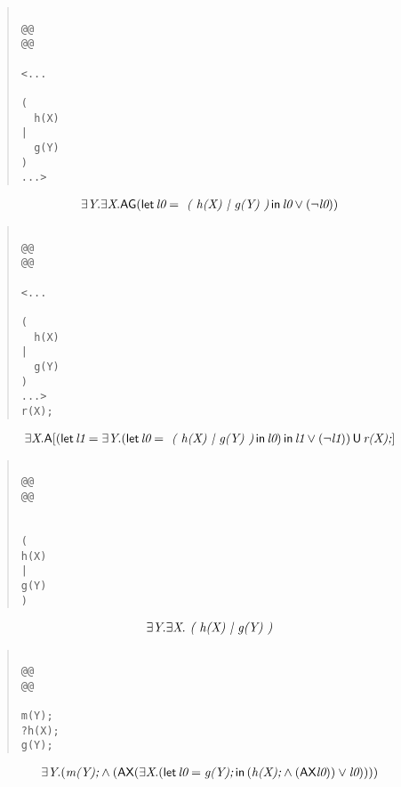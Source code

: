 \documentclass{article}
\newcommand{\U}{\,\mbox{\sf{U}}\,}
\newcommand{\A}{\mbox{\sf{A}}}
\newcommand{\AX}{\mbox{\sf{AX}}}
\newcommand{\AG}{\mbox{\sf{AG}}}
\newcommand{\mita}[1]{\mbox{\it{{#1}}}}
\begin{document}
\begin{quote}\begin{verbatim}

@@
@@

<...
  
(
  h(X)
|
  g(Y)
)
...>
\end{verbatim}\end{quote}

\[\begin{array}{l}
\exists \mita{Y} . \exists \mita{X} . \AG(\mita{\sf{let}} \, \mita{l0} = \mita{
(
h(X)
|
g(Y)
)} \, \mita{\sf{in}} \, \mita{l0} \vee (\neg \mita{l0})
)
\end{array}\]

\begin{quote}\begin{verbatim}

@@
@@

<...
  
(
  h(X)
|
  g(Y)
)
...>
r(X);
\end{verbatim}\end{quote}

\[\begin{array}{l}
\exists \mita{X} . \A[(\mita{\sf{let}} \, \mita{l1} = \exists \mita{Y} . (\mita{\sf{let}} \, \mita{l0} = \mita{
(
h(X)
|
g(Y)
)} \, \mita{\sf{in}} \, \mita{l0}
) \, \mita{\sf{in}} \, \mita{l1} \vee (\neg \mita{l1})
) \U \mita{r(X);}]

\end{array}\]

\begin{quote}\begin{verbatim}

@@
@@


(
h(X)
|
g(Y)
)
\end{verbatim}\end{quote}

\[\begin{array}{l}
\exists \mita{Y} . \exists \mita{X} . \mita{
(
h(X)
|
g(Y)
)}
\end{array}\]

\begin{quote}\begin{verbatim}

@@
@@

m(Y);
?h(X);
g(Y);
\end{verbatim}\end{quote}

\[\begin{array}{l}
\exists \mita{Y} . (\mita{m(Y);} \wedge (\AX(\exists \mita{X} . (\mita{\sf{let}} \, \mita{l0} = \mita{g(Y);} \, \mita{\sf{in}} \, (\mita{h(X);} \wedge (\AX\mita{l0})) \vee \mita{l0}
))))
\end{array}\]
\end{document}
